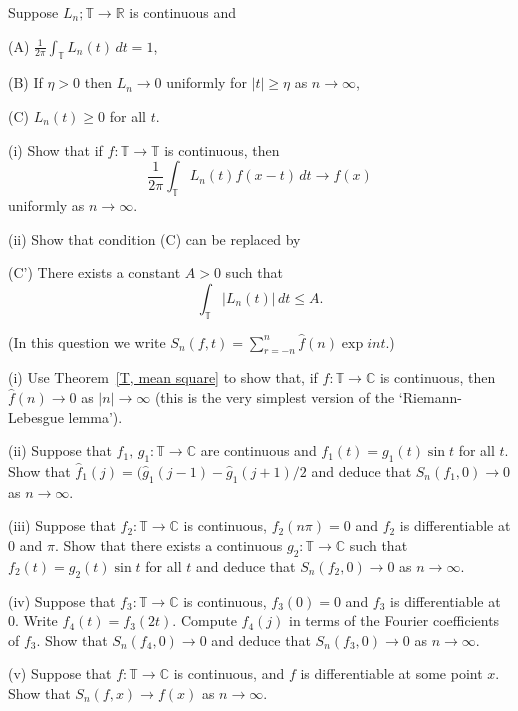 \begin{question}\label{Exercise, good kernel}
Suppose $L_{n};{\mathbb T}\rightarrow{\mathbb R}$
is continuous and

(A) $\frac{1}{2\pi}\int_{\mathbb T}L_{n}(t)\, dt=1$,

(B) If $\eta>0$ then $L_{n}\rightarrow 0$ uniformly
for $|t|\geq \eta$
as $n\rightarrow\infty$,

(C) $L_{n}(t)\geq 0$ for all $t$.

(i) Show that if $f:{\mathbb T}\rightarrow{\mathbb T}$
is continuous, then
\[\frac{1}{2\pi}\int_{\mathbb T}L_{n}(t)f(x-t)\, dt\rightarrow f(x)\]
uniformly as $n\rightarrow\infty$.

(ii) Show that condition (C) can be replaced by

(C') There exists a constant $A>0$ such that
\[\int_{\mathbb T}|L_{n}(t)|\, dt\leq A.\]
\end{question}
\begin{question}
(In this question we write $S_{n}(f,t)=\sum_{r=-n}^{n}\hat{f}(n)\exp int$.)

(i) Use Theorem~\ref{T, mean square} to show that, if
$f:{\mathbb T}\rightarrow{\mathbb C}$
is continuous, then $\hat{f}(n)\rightarrow 0$
as $|n|\rightarrow\infty$ (this is the very simplest
version of the `Riemann-Lebesgue lemma').

(ii)  Suppose that $f_{1},\, g_{1}:{\mathbb T}\rightarrow{\mathbb C}$
are continuous
and $f_{1}(t)=g_{1}(t)\sin t$ for all $t$.
Show that
$\hat{f}_{1}(j)=(\hat{g}_{1}(j-1)-\hat{g}_{1}(j+1)/2$
and deduce that $S_{n}(f_{1},0)\rightarrow 0$
as $n\rightarrow\infty$.

(iii) Suppose that $f_{2}:{\mathbb T}\rightarrow{\mathbb C}$
is continuous,
$f_{2}(n\pi)=0$ and $f_{2}$ is differentiable at $0$ and $\pi$.
Show that there exists a
continuous $g_{2}:{\mathbb T}\rightarrow{\mathbb C}$
such that $f_{2}(t)=g_{2}(t)\sin t$ for all $t$
and deduce that $S_{n}(f_{2},0)\rightarrow 0$
as $n\rightarrow\infty$.

(iv) Suppose that $f_{3}:{\mathbb T}\rightarrow{\mathbb C}$
is continuous,
$f_{3}(0)=0$ and $f_{3}$ is differentiable at $0$.
Write $f_{4}(t)=f_{3}(2t)$.
Compute $\hat{f}_{4}(j)$
in terms of the Fourier coefficients of $f_{3}$.
Show that $S_{n}(f_{4},0)\rightarrow 0$
and deduce that $S_{n}(f_{3},0)\rightarrow 0$
as $n\rightarrow\infty$.

(v) Suppose that $f:{\mathbb T}\rightarrow{\mathbb C}$
is continuous,
and $f$ is differentiable at some point $x$.
Show that $S_{n}(f,x)\rightarrow f(x)$
as $n\rightarrow\infty$.
\end{question}
